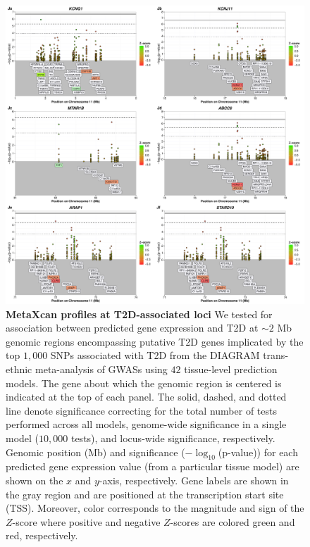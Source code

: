 \documentclass[10pt]{article}
\begin{document}
\begin{figure}
\ContinuedFloat
\includegraphics[width=\textwidth]{sup_fig1_part10_locusArray.pdf}
	\caption{\textbf{MetaXcan profiles at T2D-associated loci} We tested for association between predicted gene expression and T2D at $\sim2$ Mb genomic regions encompassing putative T2D genes implicated by the top $1,000$ SNPs associated with T2D from the DIAGRAM trans-ethnic meta-analysis of GWASs using $42$ tissue-level prediction models. The gene about which the genomic region is centered is indicated at the top of each panel. The solid, dashed, and dotted line denote significance correcting for the total number of tests performed across all models, genome-wide significance in a single model ($10,000$ tests), and locus-wide significance, respectively. Genomic position (Mb) and significance ($-\log_{10}$(p-value)) for each predicted gene expression value (from a particular tissue model) are shown on the $x$ and $y$-axis, respectively. Gene labels are shown in the gray region and are positioned at the transcription start site (TSS). Moreover, color corresponds to the magnitude and sign of the $Z$-score where positive and negative $Z$-scores are colored green and red, respectively.} 
    \label{fig:supp.locus_array_fig1_part10}
\end{figure}
\end{document}
